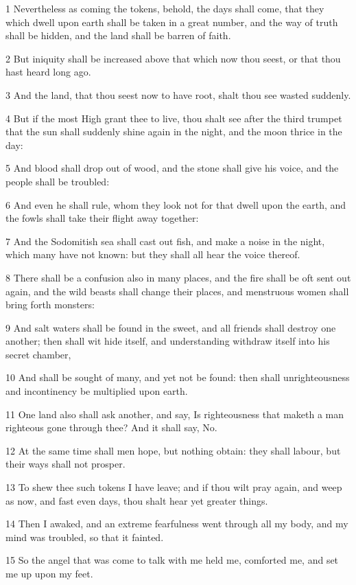 \par 1 Nevertheless as coming the tokens, behold, the days shall come, that they which dwell upon earth shall be taken in a great number, and the way of truth shall be hidden, and the land shall be barren of faith.
\par 2 But iniquity shall be increased above that which now thou seest, or that thou hast heard long ago.
\par 3 And the land, that thou seest now to have root, shalt thou see wasted suddenly.
\par 4 But if the most High grant thee to live, thou shalt see after the third trumpet that the sun shall suddenly shine again in the night, and the moon thrice in the day:
\par 5 And blood shall drop out of wood, and the stone shall give his voice, and the people shall be troubled:
\par 6 And even he shall rule, whom they look not for that dwell upon the earth, and the fowls shall take their flight away together:
\par 7 And the Sodomitish sea shall cast out fish, and make a noise in the night, which many have not known: but they shall all hear the voice thereof.
\par 8 There shall be a confusion also in many places, and the fire shall be oft sent out again, and the wild beasts shall change their places, and menstruous women shall bring forth monsters:
\par 9 And salt waters shall be found in the sweet, and all friends shall destroy one another; then shall wit hide itself, and understanding withdraw itself into his secret chamber,
\par 10 And shall be sought of many, and yet not be found: then shall unrighteousness and incontinency be multiplied upon earth.
\par 11 One land also shall ask another, and say, Is righteousness that maketh a man righteous gone through thee? And it shall say, No.
\par 12 At the same time shall men hope, but nothing obtain: they shall labour, but their ways shall not prosper.
\par 13 To shew thee such tokens I have leave; and if thou wilt pray again, and weep as now, and fast even days, thou shalt hear yet greater things.
\par 14 Then I awaked, and an extreme fearfulness went through all my body, and my mind was troubled, so that it fainted.
\par 15 So the angel that was come to talk with me held me, comforted me, and set me up upon my feet.
